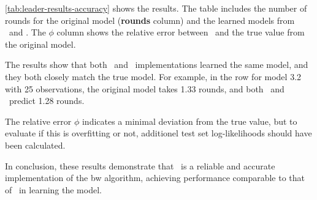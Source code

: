 \autoref{tab:leader-results-accuracy} shows the results. The table includes the number of rounds for the original model (\textbf{rounds} column) and the learned models from \Jajapy\ and \Cupaal.
The $\phi$ column shows the relative error between \Jajapy\ and the true value from the original model.

The results show that both \Cupaal\ and \Jajapy\  implementations learned the same model, and they both closely match the true model. For example, in the row for model 3.2 with 25 observations, the original model takes 1.33 rounds, and both \Cupaal\ and \Jajapy\  predict 1.28 rounds.

The relative error $\phi$ indicates a minimal deviation from the true value, but to evaluate if this is overfitting or not, additionel test set log-likelihoods should have been calculated.

In conclusion, these results demonstrate that \Cupaal\ is a reliable and accurate implementation of the \gls{bw} algorithm, achieving performance comparable to that of \Jajapy\ in learning the model.



